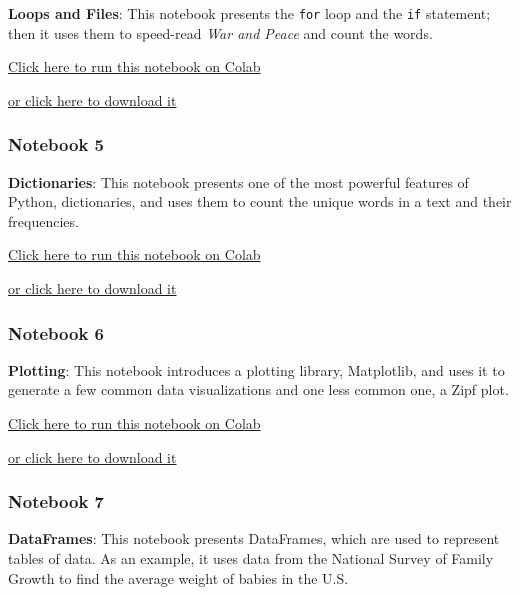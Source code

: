 \textbf{Loops and Files}: This notebook presents the \texttt{for} loop
and the \texttt{if} statement; then it uses them to speed-read \emph{War
and Peace} and count the words.

\href{https://colab.research.google.com/github/AllenDowney/ElementsOfDataScience/blob/v1/04_loops.ipynb}{Click
here to run this notebook on Colab}

\href{https://github.com/AllenDowney/ElementsOfDataScience/raw/v1/04_loops.ipynb}{or
click here to download it}

\hypertarget{notebook-5}{%
\subsubsection{Notebook 5}\label{notebook-5}}

\textbf{Dictionaries}: This notebook presents one of the most powerful
features of Python, dictionaries, and uses them to count the unique
words in a text and their frequencies.

\href{https://colab.research.google.com/github/AllenDowney/ElementsOfDataScience/blob/v1/05_dictionaries.ipynb}{Click
here to run this notebook on Colab}

\href{https://github.com/AllenDowney/ElementsOfDataScience/raw/v1/05_dictionaries.ipynb}{or
click here to download it}

\hypertarget{notebook-6}{%
\subsubsection{Notebook 6}\label{notebook-6}}

\textbf{Plotting}: This notebook introduces a plotting library,
Matplotlib, and uses it to generate a few common data visualizations and
one less common one, a Zipf plot.

\href{https://colab.research.google.com/github/AllenDowney/ElementsOfDataScience/blob/v1/06_plotting.ipynb}{Click
here to run this notebook on Colab}

\href{https://github.com/AllenDowney/ElementsOfDataScience/raw/v1/06_plotting.ipynb}{or
click here to download it}

\hypertarget{notebook-7}{%
\subsubsection{Notebook 7}\label{notebook-7}}

\textbf{DataFrames}: This notebook presents DataFrames, which are used
to represent tables of data. As an example, it uses data from the
National Survey of Family Growth to find the average weight of babies in
the U.S.

